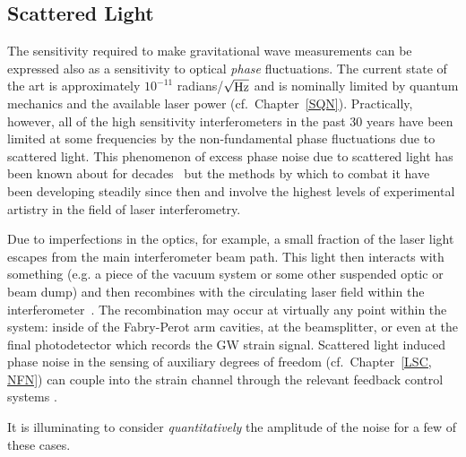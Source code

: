 \subsection{Scattered Light}
\label{s:IDC:scatter}
The sensitivity required to make gravitational wave measurements can
be expressed also as a sensitivity to optical \textit{phase} fluctuations.
The current state of the art is approximately
$10^{-11}$ radians/$\sqrt{\rm Hz}$ and is nominally limited by
quantum mechanics and the available laser power
(cf.~Chapter~\ref{SQN}).
Practically, however, all of the high
sensitivity interferometers in the past 30 years have been limited
at some frequencies by the non-fundamental phase fluctuations due to
scattered light. This phenomenon of excess phase noise due to scattered
light has been known about for decades~\cite{Schilling:1981} but
the methods by which to combat it have been developing steadily since
then and involve the highest levels of experimental artistry in the
field of laser interferometry.

Due to imperfections in the optics, for example, a small fraction of
the laser light escapes from the main interferometer beam path. This
light then interacts with something (e.g. a piece of the vacuum system
or some other suspended optic or beam dump) and then recombines with the
circulating laser field within the
interferometer~\cite{Kip:Scatter95, Kip:Baffles1989, Sam:Scatter2012,
Stefano:Scatter, vinet1997scattered, fritschel1998high}.
The recombination may occur at virtually any point within the system:
inside of the Fabry-Perot arm cavities, at the beamsplitter, or even at
the final photodetector which records the GW strain signal. Scattered
light induced phase noise in the sensing of auxiliary degrees of
freedom (cf.~Chapter~\ref{LSC, NFN}) can couple into the strain channel
through the relevant feedback control systems .

It is illuminating to consider \emph{quantitatively} the 
amplitude of the noise for a few of these cases.


